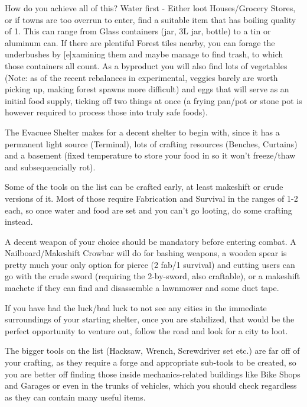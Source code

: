 How do you achieve all of this? Water first - Either loot Houses/Grocery Stores, or if towns are too overrun to enter, find a suitable item that has boiling quality of 1. This can range from Glass containers (jar, 3L jar, bottle) to a tin or aluminum can. If there are plentiful Forest tiles nearby, you can forage the underbushes by [e]xamining them and maybe manage to find trash, to which those containers all count. As a byproduct you will also find lots of vegetables (Note: as of the recent rebalances in experimental, veggies barely are worth picking up, making forest spawns more difficult) and eggs that will serve as an initial food supply, ticking off two things at once (a frying pan/pot or stone pot is however required to process those into truly safe foods).

The Evacuee Shelter makes for a decent shelter to begin with, since it has a permanent light source (Terminal), lots of crafting resources (Benches, Curtains) and a basement (fixed temperature to store your food in so it won't freeze/thaw and subsequencially rot).

Some of the tools on the list can be crafted early, at least makeshift or crude versions of it. Most of those require Fabrication and Survival in the ranges of 1-2 each, so once water and food are set and you can't go looting, do some crafting instead.

A decent weapon of your choice should be mandatory before entering combat. A Nailboard/Makeshift Crowbar will do for bashing weapons, a wooden spear is pretty much your only option for pierce (2 fab/1 survival) and cutting users can go with the crude sword (requiring the 2-by-sword, also craftable), or a makeshift machete if they can find and disassemble a lawnmower and some duct tape.

If you have had the luck/bad luck to not see any cities in the immediate surroundings of your starting shelter, once you are stabilized, that would be the perfect opportunity to venture out, follow the road and look for a city to loot.

The bigger tools on the list (Hacksaw, Wrench, Screwdriver set etc.) are far off of your crafting, as they require a forge and appropriate sub-tools to be created, so you are better off finding those inside mechanics-related buildings like Bike Shops and Garages or even in the trunks of vehicles, which you should check regardless as they can contain many useful items.

